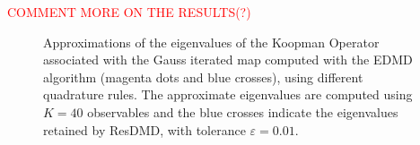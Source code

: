 \textcolor{red}{COMMENT MORE ON THE RESULTS(?)}

\begin{figure}[h]
\centering
{}
\caption{Approximations of the eigenvalues of the Koopman Operator associated with the Gauss iterated map computed with the EDMD algorithm (magenta dots and blue crosses), using different quadrature rules. The approximate eigenvalues are computed using $K=40$ observables and the blue crosses indicate the eigenvalues retained by ResDMD, with tolerance $\varepsilon = 0.01$.}
\label{fig_resdmd_quadrature_comparison}
\end{figure}

